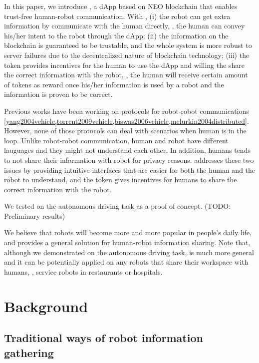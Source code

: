 \documentclass{article}
\begin{document}
In this paper, we introduce \nrc, a dApp based 
on NEO blockchain that enables trust-free human-robot 
communication.
With \nrc, (i) the robot can get extra information
by communicate with the human directly, 
\eg, the human can convey his/her intent to the robot 
through the \nrc dApp; 
(ii) the information on the blockchain is guaranteed to
be trustable, and the whole system is more robust to server
failures due to the decentralized nature of blockchain
technology; (iii) the \nrc token provides incentives
for the human to use the dApp and willing the share the
correct information with the robot, \ie, the human will receive
certain amount of tokens as reward once his/her information
is used by a robot and the information is proven to be correct.


Previous works have been working on 
protocols for robot-robot communications 
\cref{yang2004vehicle,torrent2009vehicle,biswas2006vehicle,mclurkin2004distributed}. 
However, none of those protocols can deal with scenarios
when human is in the loop.
Unlike robot-robot communication, human and robot 
have different lauguages and they might not understand
each other. In addition, humans tends to not share their
information with robot for privacy reasons.
\nrc addresses these two issues by providing intuitive
interfaces that are easier for both the human and the robot
to understand, and the \nrc token gives incentives for humans to
share the correct information with the robot.


We tested \nrc on the autonomous driving task as a proof of
concept.
(TODO: Preliminary results)


We believe that robots will become more and more popular in
people's daily life, and \nrc provides a general solution
for human-robot information sharing.
Note that, although we demonstrated \nrc on the autonomous
driving task, \nrc is much more general and it can
be potentially applied on any robots that share their workspace
with humans, \eg, service robots in restaurants or hospitals.


\section{Background}
\label{sec:background}

\subsection{Traditional ways of robot information gathering}
\label{subsec:tranditional-ways}
\end{document}
